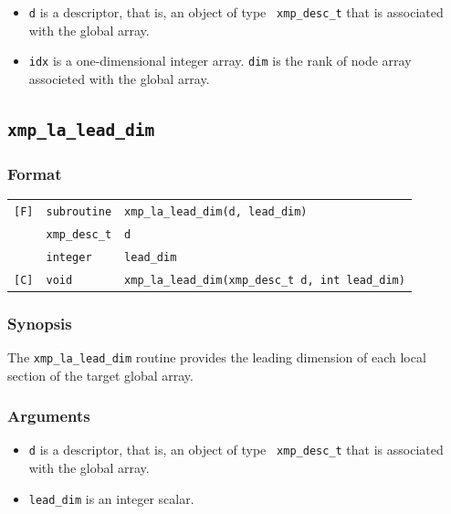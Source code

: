 \begin{itemize}
 \item {\tt d} is a descriptor, that is, an object of type {\tt
       xmp\_desc\_t} that is associated with the global array.
 \item {\tt idx} is a one-dimensional integer array. {\tt dim} is the
       rank of node array associeted with the global array.
\end{itemize}


\subsection{\tt xmp\_la\_lead\_dim}

\subsubsection*{Format}

\begin{tabular}{lll}

\verb![F]!&  {\tt subroutine}& {\tt xmp\_la\_lead\_dim(d, lead\_dim)}\\
          & {\tt xmp\_desc\_t} & {\tt d}\\
          & {\tt integer} & {\tt lead\_dim}\\

\verb![C]!&  {\tt void}& {\tt xmp\_la\_lead\_dim(xmp\_desc\_t d, int lead\_dim)}\\

\end{tabular}

\subsubsection*{Synopsis}

The {\tt xmp\_la\_lead\_dim} routine provides the leading dimension of
each local section of the target global array.

\subsubsection*{Arguments}

\begin{itemize}
 \item {\tt d} is a descriptor, that is, an object of type {\tt
       xmp\_desc\_t} that is associated with the global array.
 \item {\tt lead\_dim} is an integer scalar.
\end{itemize}


